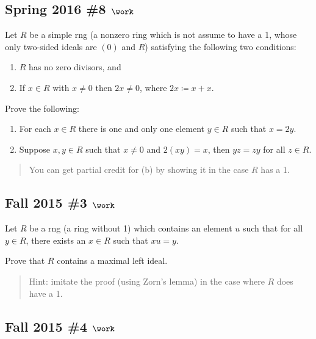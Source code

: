 \hypertarget{spring-2016-8-work}{%
\subsection{\texorpdfstring{Spring 2016 \#8
\(\work\)}{Spring 2016 \#8 \textbackslash work}}\label{spring-2016-8-work}}

Let \(R\) be a simple rng (a nonzero ring which is not assume to have a
1, whose only two-sided ideals are \((0)\) and \(R\)) satisfying the
following two conditions:

\begin{enumerate}
\def\labelenumi{\roman{enumi}.}
\tightlist
\item
  \(R\) has no zero divisors, and
\item
  If \(x\in R\) with \(x\neq 0\) then \(2x\neq 0\), where
  \(2x\coloneqq x+x\).
\end{enumerate}

Prove the following:

\begin{enumerate}
\def\labelenumi{\alph{enumi}.}
\item
  For each \(x\in R\) there is one and only one element \(y\in R\) such
  that \(x = 2y\).
\item
  Suppose \(x,y\in R\) such that \(x\neq 0\) and \(2(xy) = x\), then
  \(yz = zy\) for all \(z\in R\).
\end{enumerate}

\begin{quote}
You can get partial credit for (b) by showing it in the case \(R\) has a
1.
\end{quote}

\hypertarget{fall-2015-3-work}{%
\subsection{\texorpdfstring{Fall 2015 \#3
\(\work\)}{Fall 2015 \#3 \textbackslash work}}\label{fall-2015-3-work}}

Let \(R\) be a rng (a ring without 1) which contains an element \(u\)
such that for all \(y\in R\), there exists an \(x\in R\) such that
\(xu=y\).

Prove that \(R\) contains a maximal left ideal.

\begin{quote}
Hint: imitate the proof (using Zorn's lemma) in the case where \(R\)
does have a 1.
\end{quote}

\hypertarget{fall-2015-4-work}{%
\subsection{\texorpdfstring{Fall 2015 \#4
\(\work\)}{Fall 2015 \#4 \textbackslash work}}\label{fall-2015-4-work}}

